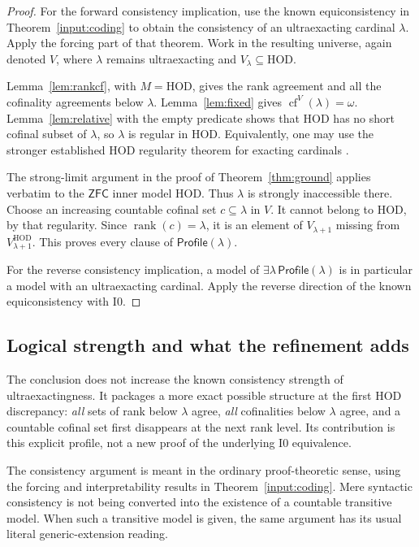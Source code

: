 \documentclass[11pt,letterpaper]{article}
\theoremstyle{definition}
\newcommand{\ZFC}{\mathsf{ZFC}}
\newcommand{\HOD}{\mathrm{HOD}}
\newcommand{\cf}{\operatorname{cf}}
\newcommand{\rank}{\operatorname{rank}}
\newcommand{\Izero}{\mathrm{I0}}
\newcommand{\Profile}{\mathsf{Profile}}
\begin{document}
\begin{proof}
For the forward consistency implication, use the known equiconsistency in Theorem~\ref{input:coding} to obtain the consistency of an ultraexacting cardinal $\lambda$. Apply the forcing part of that theorem. Work in the resulting universe, again denoted $V$, where $\lambda$ remains ultraexacting and $V_\lambda\subseteq\HOD$.

Lemma~\ref{lem:rankcf}, with $M=\HOD$, gives the rank agreement and all the cofinality agreements below $\lambda$. Lemma~\ref{lem:fixed} gives $\cf^V(\lambda)=\omega$. Lemma~\ref{lem:relative} with the empty predicate shows that $\HOD$ has no short cofinal subset of $\lambda$, so $\lambda$ is regular in $\HOD$. Equivalently, one may use the stronger established HOD regularity theorem for exacting cardinals \cite[Theorem 2.10]{abl}.

The strong-limit argument in the proof of Theorem~\ref{thm:ground} applies verbatim to the $\ZFC$ inner model $\HOD$. Thus $\lambda$ is strongly inaccessible there. Choose an increasing countable cofinal set $c\subseteq\lambda$ in $V$. It cannot belong to $\HOD$, by that regularity. Since $\rank(c)=\lambda$, it is an element of $V_{\lambda+1}$ missing from $V_{\lambda+1}^{\HOD}$. This proves every clause of $\Profile(\lambda)$.

For the reverse consistency implication, a model of $\exists\lambda\,\Profile(\lambda)$ is in particular a model with an ultraexacting cardinal. Apply the reverse direction of the known equiconsistency with $\Izero$.
\end{proof}

\subsection{Logical strength and what the refinement adds}

The conclusion does not increase the known consistency strength of ultraexactingness. It packages a more exact possible structure at the first HOD discrepancy: \emph{all} sets of rank below $\lambda$ agree, \emph{all} cofinalities below $\lambda$ agree, and a countable cofinal set first disappears at the next rank level. Its contribution is this explicit profile, not a new proof of the underlying $\Izero$ equivalence.

The consistency argument is meant in the ordinary proof-theoretic sense, using the forcing and interpretability results in Theorem~\ref{input:coding}. Mere syntactic consistency is not being converted into the existence of a countable transitive model. When such a transitive model is given, the same argument has its usual literal generic-extension reading.
\end{document}

